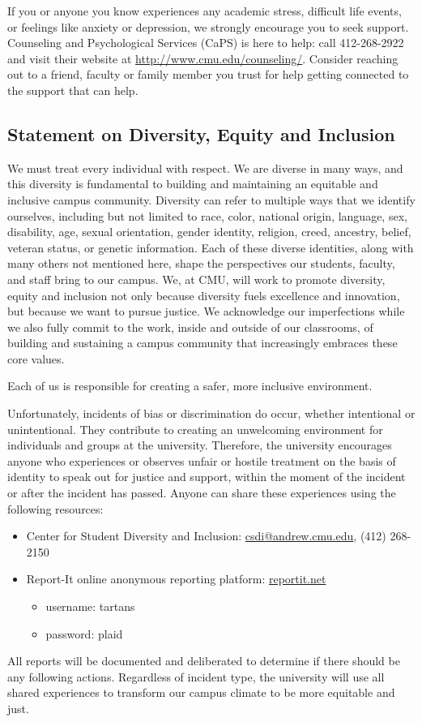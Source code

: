 \documentclass{article}
\begin{document}
If you or anyone you know experiences any academic stress, difficult life
events, or feelings like anxiety or depression, we strongly encourage you to
seek support. Counseling and Psychological Services (CaPS) is here to help: call
412-268-2922 and visit their website at \url{http://www.cmu.edu/counseling/}.
Consider reaching out to a friend, faculty or family member you trust for help
getting connected to the support that can help.

\subsection*{Statement on Diversity, Equity and Inclusion}

We must treat every individual with respect. We are diverse in many ways, and
this diversity is fundamental to building and maintaining an equitable and
inclusive campus community. Diversity can refer to multiple ways that we
identify ourselves, including but not limited to race, color, national origin,
language, sex, disability, age, sexual orientation, gender identity, religion,
creed, ancestry, belief, veteran status, or genetic information. Each of these
diverse identities, along with many others not mentioned here, shape the
perspectives our students, faculty, and staff bring to our campus. We, at CMU,
will work to promote diversity, equity and inclusion not only because diversity
fuels excellence and innovation, but because we want to pursue justice. We
acknowledge our imperfections while we also fully commit to the work, inside and
outside of our classrooms, of building and sustaining a campus community that
increasingly embraces these core values.

Each of us is responsible for creating a safer, more inclusive environment.

Unfortunately, incidents of bias or discrimination do occur, whether intentional
or unintentional. They contribute to creating an unwelcoming environment for
individuals and groups at the university. Therefore, the university encourages
anyone who experiences or observes unfair or hostile treatment on the basis of
identity to speak out for justice and support, within the moment of the incident
or after the incident has passed. Anyone can share these experiences using the
following resources:

\begin{itemize}
    \item Center for Student Diversity and Inclusion: 
        \href{mailto:csdi@andrew.cmu.edu}{csdi@andrew.cmu.edu},
        (412) 268-2150
    \item Report-It online anonymous reporting platform: \url{reportit.net}
    \begin{itemize}
        \item username: tartans
        \item password: plaid
    \end{itemize}
\end{itemize}

All reports will be documented and deliberated to determine if there should be
any following actions. Regardless of incident type, the university will use all
shared experiences to transform our campus climate to be more equitable and
just.
\end{document}
